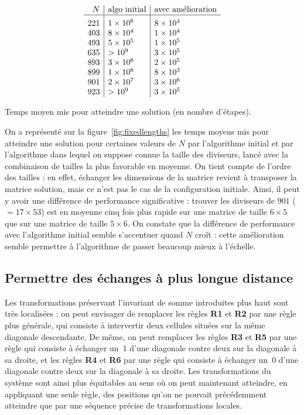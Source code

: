 \documentclass[11pt, openany, a4paper]{article}
\newcommand{\e}[1]{\ensuremath{\times 10^{#1}}}
\begin{document}
\begin{floatingfigure}[r]{0.5\textwidth}
\centering
\[
\begin{array}{r|l|l}
N&\text{algo initial}&\text{avec amélioration}\\
\hline
\rule{0pt}{3ex}   221&1\e{6}&8\e{4}\\
403&8\e{4}&1\e{4}\\
493&5\e{5}&1\e{5}\\
635& >10^9&3\e{5}\\
893&3\e{6}&2\e{5}\\
899&1\e{6}&8\e{3}\\
901&2\e{7}&3\e{6}\\
923& >10^9&3\e{5}
\end{array}
\]
\caption{Temps moyen mis pour atteindre une solution (en nombre d'étapes).}
\label{fig:fixedlengths}
\end{floatingfigure}
On a représenté sur la figure~\ref{fig:fixedlengths} les temps moyens mis pour atteindre une solution pour certaines valeurs de $N$ par l'algorithme initial et par l'algorithme dans lequel on suppose connue la taille des diviseurs, lancé avec la combinaison de tailles la plus favorable en moyenne. On tient compte de l'ordre des tailles : en effet, échanger les dimensions de la matrice revient à transposer la matrice solution, mais ce n'est pas le cas de la configuration initiale. Ainsi, il peut y avoir une différence de performance significative : trouver les diviseurs de $901$ ($=17 \times 53$) est en moyenne cinq fois plus rapide sur une matrice de taille $6\times 5$ que sur une matrice de taille $5 \times 6$.
On constate que la différence de performance avec l'algorithme initial semble s'accentuer quand $N$ croît : cette amélioration semble permettre à l'algorithme de passer beaucoup mieux à l'échelle.

\subsection{Permettre des échanges à plus longue distance}

Les transformations préservant l'invariant de somme introduites plus haut sont très localisées : on peut envisager de remplacer les règles \textbf{R1} et \textbf{R2} par une règle plus générale, qui consiste à intervertir deux cellules situées sur la même diagonale descendante. De même, on peut remplacer les règles \textbf{R3} et \textbf{R5} par une règle qui consiste à échanger un~$1$ d'une diagonale contre deux sur la diagonale à sa droite, et les règles \textbf{R4} et \textbf{R6} par une règle qui consiste à échanger un~$0$ d'une diagonale contre deux sur la diagonale à sa droite. Les transformations du système sont ainsi plus équitables au sens où on peut maintenant atteindre, en appliquant une seule règle, des positions qu'on ne pouvait précédemment atteindre que par une séquence précise de transformations locales. 
\end{document}

